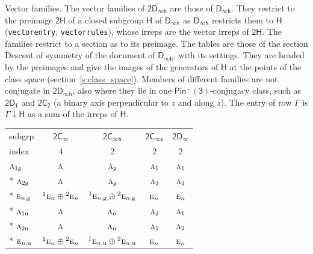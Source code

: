 \documentclass[10pt,a4paper]{article}
\makeatletter
\renewcommand\paragraph{\@startsection{paragraph}{4}{\z@}{1.5ex plus .5ex minus .2ex}{-1em}%
  {\normalfont\small\sffamily\bfseries\color{parttitle}}}
\numberwithin{equation}{section}
\newcommand{\grp}[1]{\mathsf{#1}}
\newcommand{\irr}[1]{\text{\normalfont\scshape #1}}
\newcommand{\conjpair}[1]{{}^{#1}}
\newcommand{\ptag}[1]{\mathrm{#1}}
\newcommand{\restr}[2]{#1\!\downarrow#2}
\makeatother
\begin{document}
\paragraph{Vector families.} The vector families of $\grp{2D_{\infty h}}$ are those of \href{../../../rotation/data/pdf/Dinfh.pdf}{$\grp{D_{\infty h}}$}. They restrict to the preimage $\grp{2H}$ of a closed subgroup $\grp{H}$ of \href{../../../rotation/data/pdf/Dinfh.pdf}{$\grp{D_{\infty h}}$} as \href{../../../rotation/data/pdf/Dinfh.pdf}{$\grp{D_{\infty h}}$} restricts them to $\grp{H}$ (\texttt{vectorentry}, \texttt{vectorrules}), whose irreps are the vector irreps of $\grp{2H}$. The families restrict to a section as to its preimage. The tables are those of the section Descent of symmetry of the document of \href{../../../rotation/data/pdf/Dinfh.pdf}{$\grp{D_{\infty h}}$}, with its settings. They are headed by the preimages and give the images of the generators of $\grp{H}$ at the points of the class space (section~\ref{s:class_space}). Members of different families are not conjugate in $\grp{2D_{\infty h}}$, also where they lie in one \href{Pinminus3.pdf}{$\grp{Pin^{-}(3)}$}-conjugacy class, such as \href{2D1.pdf}{$\grp{2D_{1}}$} and \href{2C2.pdf}{$\grp{2C_{2}}$} (a binary axis perpendicular to $z$ and along $z$). \label{n:irrep.Gamma.subgroup}The entry of row $\Gamma$ is $\restr{\Gamma}{\grp{H}}$ as a sum of the irreps of $\grp{H}$.
{\small\begin{longtable}{@{}lcccc@{}}\toprule
subgrp & \href{2Cinf.pdf}{$\grp{2C_{\infty }}$} & \href{2Cinfh.pdf}{$\grp{2C_{\infty h}}$} & \href{2Cinfv.pdf}{$\grp{2C_{\infty v}}$} & \href{2Dinf.pdf}{$\grp{2D_{\infty }}$}\\
index & 4 & 2 & 2 & 2\\\midrule\endhead
\bottomrule\endfoot\endlastfoot
$\irr{a}_{1\ptag{g}}$ & $\irr{a}$ & $\irr{a}_{\ptag{g}}$ & $\irr{a}_{1}$ & $\irr{a}_{1}$\\*
$\irr{a}_{2\ptag{g}}$ & $\irr{a}$ & $\irr{a}_{\ptag{g}}$ & $\irr{a}_{2}$ & $\irr{a}_{2}$\\*
$\irr{e}_{n,\ptag{g}}$ & $\conjpair{1}\irr{e}_{n}\oplus \conjpair{2}\irr{e}_{n}$ & $\conjpair{1}\irr{e}_{n,\ptag{g}}\oplus \conjpair{2}\irr{e}_{n,\ptag{g}}$ & $\irr{e}_{n}$ & $\irr{e}_{n}$\\*
$\irr{a}_{1\ptag{u}}$ & $\irr{a}$ & $\irr{a}_{\ptag{u}}$ & $\irr{a}_{2}$ & $\irr{a}_{1}$\\*
$\irr{a}_{2\ptag{u}}$ & $\irr{a}$ & $\irr{a}_{\ptag{u}}$ & $\irr{a}_{1}$ & $\irr{a}_{2}$\\*
$\irr{e}_{n,\ptag{u}}$ & $\conjpair{1}\irr{e}_{n}\oplus \conjpair{2}\irr{e}_{n}$ & $\conjpair{1}\irr{e}_{n,\ptag{u}}\oplus \conjpair{2}\irr{e}_{n,\ptag{u}}$ & $\irr{e}_{n}$ & $\irr{e}_{n}$\\
\bottomrule\end{longtable}}
\end{document}
